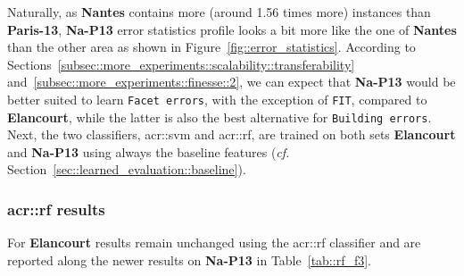         Naturally, as \textbf{Nantes} contains more (around 1.56 times more) instances than \textbf{Paris-13}, \textbf{Na-P13} error statistics profile looks a bit more like the one of \textbf{Nantes} than the other area as shown in Figure~\ref{fig::error_statistics}.
        According to Sections~\ref{subsec::more_experiments::scalability::transferability} and~\ref{subsec::more_experiments::finesse::2}, we can expect that \textbf{Na-P13} would be better suited to learn \texttt{Facet errors}, with the exception of \texttt{FIT}, compared to \textbf{Elancourt}, while the latter is also the best alternative for \texttt{Building errors}.
        Next, the two classifiers, \gls{acr::svm} and \gls{acr::rf}, are trained on both sets \textbf{Elancourt} and \textbf{Na-P13} using always the baseline features (\textit{cf.} Section~\ref{sec::learned_evaluation::baseline}).

    \subsubsection{\texorpdfstring{\acrshort*{acr::rf}}{RF} results}
        \label{subsec::more_experiments::classifier::rf}
        For \textbf{Elancourt} results remain unchanged using the \gls{acr::rf} classifier and are reported along the newer results on \textbf{Na-P13} in Table~\ref{tab::rf_f3}.\\

